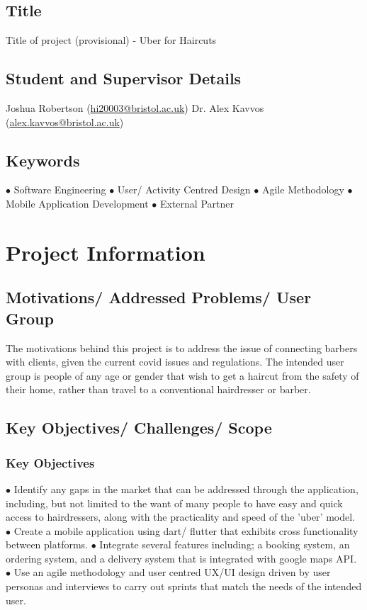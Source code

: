 \documentclass[12pt]{article}
\begin{document}
\subsection{Title}
Title of project (provisional) - Uber for Haircuts

\subsection{Student and Supervisor Details}
Joshua Robertson (\href{mailto:hi20003@bristol.ac.uk}{hi20003@bristol.ac.uk})
\newline
Dr. Alex Kavvos (\href{mailto:alex.kavvos@bristol.ac.uk}{alex.kavvos@bristol.ac.uk})

\subsection{Keywords}
$\bullet$ Software Engineering
\newline
$\bullet$ User/ Activity Centred Design
\newline
$\bullet$ Agile Methodology
\newline
$\bullet$ Mobile Application Development
\newline
$\bullet$ External Partner

\section{Project Information}
\subsection{Motivations/ Addressed Problems/ User Group}
The motivations behind this project is to address the issue of connecting barbers with clients, given the current covid issues and regulations. The intended user group is people of any age or gender that wish to get a haircut from the safety of their home, rather than travel to a conventional hairdresser or barber.
\subsection{Key Objectives/ Challenges/ Scope}
\subsubsection{Key Objectives}
$\bullet$ Identify any gaps in the market that can be addressed through the application, including, but not limited to the want of many people to have easy and quick access to hairdressers, along with the practicality and speed of the 'uber' model.
\newline
$\bullet$ Create a mobile application using dart/ flutter that exhibits cross functionality between platforms.
\newline
$\bullet$ Integrate several features including; a booking system, an ordering system, and a delivery system that is integrated with google maps API.
\newline
$\bullet$ Use an agile methodology and user centred UX/UI design driven by user personas and interviews to carry out sprints that match the needs of the intended user.
\newline
\end{document}
